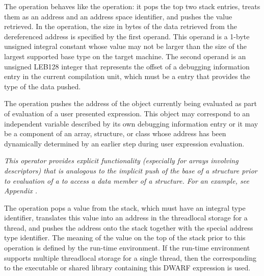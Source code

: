 \begin{enumerate}[1. ]
\itembfnl{\DWOPxdereftypeTARG}
The \DWOPxdereftypeNAME{} operation behaves like the \DWOPxderefsize{}
operation: it pops the top two stack entries, treats them as an address and
an address space identifier, and pushes the value retrieved. In the
\DWOPxdereftypeNAME{} operation, the size in bytes of the data retrieved from
the dereferenced address is specified by the first operand. This operand is
a 1-byte unsigned integral constant whose value may not be larger than the
size of the largest supported base type on the target machine. The second
operand is an unsigned LEB128 integer that represents the offset of a
debugging information entry in the current compilation unit, which must be a
\DWTAGbasetype{} entry that provides the type of the data pushed.

\itembfnl{\DWOPpushobjectaddressTARG}
The \DWOPpushobjectaddressNAME{}
operation pushes the address
of the object currently being evaluated as part of evaluation
of a user presented expression. This object may correspond
to an independent variable described by its own debugging
information entry or it may be a component of an array,
structure, or class whose address has been dynamically
determined by an earlier step during user expression
evaluation.

\textit{This operator provides explicit functionality
(especially for arrays involving descriptors) that is analogous
to the implicit push of the base 
of a structure prior to evaluation of a 
\DWATdatamemberlocation{} 
to access a data member of a structure. For an example, see 
Appendix .}

\itembfnl{\DWOPformtlsaddressTARG}
The \DWOPformtlsaddressNAME{} 
operation pops a value from the stack, which must have an 
integral type identifier, translates this
value into an address in the 
thread\dash local storage for a thread, and pushes the address 
onto the stack together with the special address type identifier. 
The meaning of the value on the top of the stack prior to this 
operation is defined by the run-time environment.  If the run-time 
environment supports multiple thread\dash local storage 
 for a single thread, then the  
corresponding to the executable or shared 
library containing this DWARF expression is used.
   

\end{enumerate}
